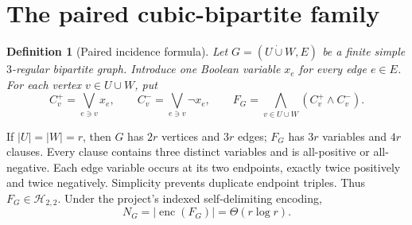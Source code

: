 \documentclass[11pt]{article}
\newtheorem{definition}{Definition}
\begin{document}
\section{The paired cubic-bipartite family}
\begin{definition}[Paired incidence formula]
Let $G=(U\mathbin{\dot\cup}W,E)$ be a finite simple $3$-regular bipartite
graph.  Introduce one Boolean variable $x_e$ for every edge $e\in E$.  For
each vertex $v\in U\cup W$, put
\[
 C_v^+=\bigvee_{e\ni v}x_e,
 \qquad
 C_v^-=\bigvee_{e\ni v}\neg x_e,
 \qquad
 F_G=\bigwedge_{v\in U\cup W}(C_v^+\wedge C_v^-).
\]
\end{definition}

If $|U|=|W|=r$, then $G$ has $2r$ vertices and $3r$ edges; $F_G$ has
$3r$ variables and $4r$ clauses.  Every clause contains three distinct
variables and is all-positive or all-negative.  Each edge variable occurs
at its two endpoints, exactly twice positively and twice negatively.
Simplicity prevents duplicate endpoint triples.  Thus
\(F_G\in\mathcal H_{2,2}\).  Under the project's indexed self-delimiting
encoding,
\[
 N_G=|\operatorname{enc}(F_G)|=\Theta(r\log r).
\]
\end{document}
